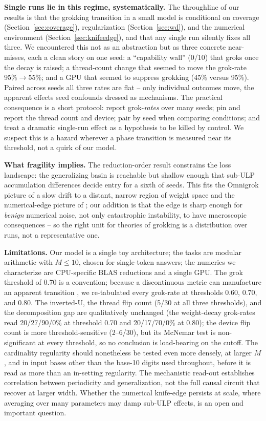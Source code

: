 \documentclass[10pt]{article} %
\begin{document}
\textbf{Single runs lie in this regime, systematically.} The throughline of our results is that the
grokking transition in a small model is conditional on coverage (Section~\ref{sec:coverage}),
regularization (Section~\ref{sec:wd}), and the numerical environment (Section~\ref{sec:knifeedge}),
and that any single run silently fixes all three. We encountered this not as an abstraction but as
three concrete near-misses, each a clean story on one seed: a ``capability wall'' (0/10) that groks
once the decay is raised; a thread-count change that seemed to move the grok-rate 95\%$\to$55\%; and
a GPU that seemed to suppress grokking (45\% versus 95\%). Paired across seeds all three rates are
flat -- only individual outcomes move, the apparent effects seed confounds dressed as mechanisms.
The practical consequence is a short protocol: report grok-\emph{rates} over many seeds; pin and
report the thread count and device; pair by seed when comparing conditions; and treat a dramatic
single-run effect as a hypothesis to be killed by control. We suspect this is a hazard wherever a
phase transition is measured near its threshold, not a quirk of our model.

\textbf{What fragility implies.} The reduction-order result constrains the loss landscape: the
generalizing basin is reachable but shallow enough that sub-ULP accumulation differences decide
entry for a sixth of seeds. This fits the Omnigrok picture of a slow drift to a distant, narrow
region of weight space and the numerical-edge picture of \citet{prieto2025edge}; our addition is
that the edge is sharp enough for \emph{benign} numerical noise, not only catastrophic instability,
to have macroscopic consequences -- so the right unit for theories of grokking is a distribution
over runs, not a representative one.

\textbf{Limitations.} Our model is a single toy architecture; the tasks are modular arithmetic with
$M \leq 10$, chosen for single-token answers; the numerics we characterize are CPU-specific BLAS
reductions and a single GPU. The grok threshold of 0.70 is a convention; because a discontinuous metric can manufacture an
apparent transition \citep{schaeffer2023mirage}, we re-tabulated every grok-rate at thresholds
0.60, 0.70, and 0.80. The inverted-U, the thread flip count (5/30 at all three thresholds), and the
decomposition gap are qualitatively unchanged (the weight-decay grok-rates read 20/27/90/0\% at
threshold 0.70 and 20/17/70/0\% at 0.80); the device flip count is more threshold-sensitive
(2--6/30), but its McNemar test is non-significant at every threshold, so no conclusion is
load-bearing on the cutoff. The cardinality regularity should
nonetheless be tested even more densely, at larger $M$, and in input bases other than the base-10
digits used throughout, before it is read as more than an in-setting regularity. The mechanistic read-out establishes correlation between periodicity and generalization, not
the full causal circuit that \citet{nanda2023progress} recover at larger width. Whether the
numerical knife-edge persists at scale, where averaging over many parameters may damp sub-ULP
effects, is an open and important question.
\end{document}
